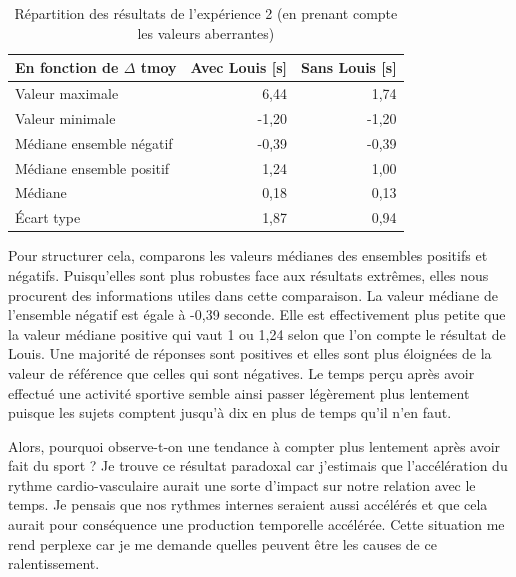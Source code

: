 \documentclass[12pt,fleqn,oneside,french,openany]{book} %
\begin{document}
\begin{table}[h!]
	\centering
	\caption{Répartition des résultats de l'expérience 2 (en prenant compte les valeurs aberrantes)} \label{tbl:analyse2.2}
	\begin{tabular}{lrr}
		\toprule 
		\textbf{En fonction de $\Delta$ tmoy} & \textbf{Avec Louis [s]} & \textbf{Sans Louis [s]} \\ \midrule
		Valeur maximale & 6,44 & 1,74 \\
		Valeur minimale & -1,20 & -1,20 \\
		Médiane ensemble négatif & -0,39 & -0,39 \\
		Médiane ensemble positif & 1,24 & 1,00 \\
		Médiane & 0,18 & 0,13 \\
		\'Ecart type & 1,87 & 0,94 \\ \bottomrule
	\end{tabular}
\end{table}

Pour structurer cela, comparons les valeurs médianes des ensembles positifs et négatifs. Puisqu'elles sont plus robustes face aux résultats extrêmes, elles nous procurent des informations utiles dans cette comparaison. La valeur médiane de l'ensemble négatif est égale à -0,39 seconde. Elle est effectivement plus petite que la valeur médiane positive qui vaut 1 ou 1,24 selon que l'on compte le résultat de Louis. Une majorité de réponses sont positives et elles sont plus éloignées de la valeur de référence que celles qui sont négatives. Le temps perçu après avoir effectué une activité sportive semble ainsi passer légèrement plus lentement puisque les sujets comptent jusqu'à dix en plus de temps qu'il n'en faut. 

Alors, pourquoi observe-t-on une tendance à compter plus lentement après avoir fait du sport ? Je trouve ce résultat paradoxal car j'estimais que l'accélération du rythme cardio-vasculaire aurait une sorte d'impact sur notre relation avec le temps. Je pensais que nos rythmes internes seraient aussi accélérés et que cela aurait pour conséquence une production temporelle accélérée. Cette situation me rend perplexe car je me demande quelles peuvent être les causes de ce ralentissement.
\end{document}
